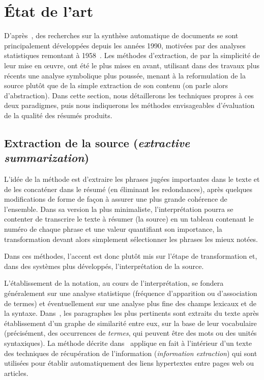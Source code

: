 \documentclass{article}           %
\begin{document}
\section{État de l'art} %
D'après~\cite{jones_automatic_2007}, des recherches sur la synthèse automatique de documents se sont principalement développées depuis les années 1990, motivées par des analyses statistiques remontant à 1958~\cite{}. Les méthodes d'extraction, de par la simplicité de leur mise en œuvre, ont été le plus mises en avant, utilisant dans des travaux plus récents une analyse symbolique plus poussée, menant à la reformulation de la source plut\^{o}t que de la simple extraction de son contenu (on parle alors d'abstraction). Dans cette section, nous détaillerons les techniques propres à ces deux paradigmes, puis nous indiquerons les méthodes envisageables d'évaluation de la qualité des résumés produits.

\subsection{Extraction de la source (\emph{extractive summarization})}

L'idée de la méthode est d'extraire les phrases jugées importantes dans le texte et de les concaténer dans le résumé (en éliminant les redondances), après quelques modifications de forme de façon à assurer une plus grande cohérence de l'ensemble. Dans sa version la plus minimaliste, l'interprétation pourra se contenter de transcrire le texte à résumer (la source) en un tableau contenant le numéro de chaque phrase et une valeur quantifiant son importance, la transformation devant alors simplement sélectionner les phrases les mieux notées.

Dans ces méthodes, l'accent est donc plut\^{o}t mis sur l'étape de transformation et, dans des systèmes plus développés, l'interprétation de la source.

L'établissement de la notation, au cours de l'interprétation, se fondera généralement sur une analyse statistique (fréquence d'apparition ou d'association de termes) et éventuellement sur une analyse plus fine des champs lexicaux et de la syntaxe.
Dans~\cite{salton_automatic_1997}, les paragraphes les plus pertinents sont extraits du texte après établissement d'un graphe de similarité entre eux, sur la base de leur vocabulaire (précisément, des occurrences de \emph{termes}, qui peuvent être des mots ou des unités syntaxiques).
La méthode décrite dans~\cite{salton_automatic_1997} applique en fait à l'intérieur d'un texte des techniques de récupération  de l'information (\emph{information extraction}) qui sont utilisées pour établir automatiquement des liens hypertextes entre pages web ou articles.
\end{document}

